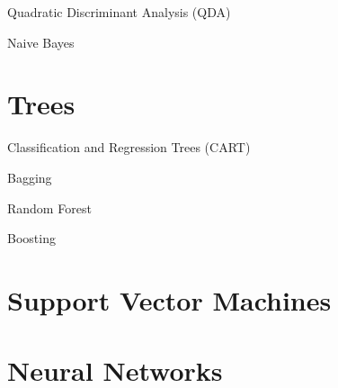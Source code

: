 \documentclass[10pt]{beamer}
\begin{document}
\begin{frame}{\secname}{Quadratic Discriminant Analysis (QDA)}
\end{frame}

\begin{frame}{\secname}{Naive Bayes}
\end{frame}

\section{Trees}
\begin{frame}{\secname}{Classification and Regression Trees (CART)}
\end{frame}

\begin{frame}{\secname}{Bagging}
\end{frame}

\begin{frame}{\secname}{Random Forest}
\end{frame}

\begin{frame}{\secname}{Boosting}
\end{frame}

\section{Support Vector Machines}
\begin{frame}{\secname}{}
\end{frame}

\section{Neural Networks}
\begin{frame}{\secname}{}
\end{frame}

{\aauwavesbg
\begin{frame}
\end{frame}}
\end{document}
